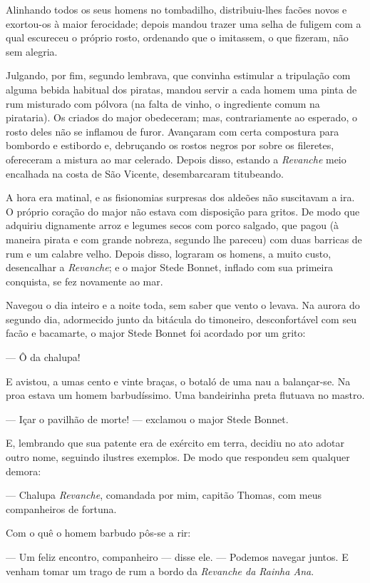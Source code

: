 Alinhando todos os seus homens no tombadilho, distribuiu-lhes facões novos
e exortou-os à maior ferocidade; depois mandou trazer uma selha de fuligem
com a qual escureceu o próprio rosto, ordenando que o imitassem, o que
fizeram, não sem alegria.

Julgando, por fim, segundo lembrava, que convinha estimular a tripulação
com alguma bebida habitual dos piratas, mandou servir a cada homem uma
pinta de rum misturado com pólvora (na falta de vinho, o ingrediente comum
na pirataria). Os criados do major obedeceram; mas, contrariamente ao
esperado, o rosto deles não se inflamou de furor. Avançaram com certa
compostura para bombordo e estibordo e, debruçando os rostos negros por
sobre os fileretes, ofereceram a mistura ao mar celerado. Depois disso,
estando a \textit{Revanche} meio encalhada na costa de São Vicente,
desembarcaram titubeando.

A hora era matinal, e as fisionomias surpresas dos aldeões não suscitavam a
ira. O próprio coração do major não estava com disposição para gritos. De
modo que adquiriu dignamente arroz e legumes secos com porco salgado, que
pagou (à maneira pirata e com grande nobreza, segundo lhe pareceu) com
duas barricas de rum e um calabre velho. Depois disso, lograram os homens,
a muito custo, desencalhar a \textit{Revanche}; e o major Stede Bonnet,
inflado com sua primeira conquista, se fez novamente ao mar.

Navegou o dia inteiro e a noite toda, sem saber que vento o levava. Na
aurora do segundo dia, adormecido junto da bitácula do timoneiro,
desconfortável com seu facão e bacamarte, o major Stede Bonnet foi
acordado por um grito:

--- Ô da chalupa!

E avistou, a umas cento e vinte braças, o botaló de uma nau a
balançar-se. Na proa estava um homem barbudíssimo. Uma bandeirinha preta
flutuava no mastro.

--- Içar o pavilhão de morte! --- exclamou o major Stede Bonnet.

E, lembrando que sua patente era de exército em terra, decidiu no ato
adotar outro nome, seguindo ilustres exemplos. De modo que respondeu sem
qualquer demora:

--- Chalupa \textit{Revanche}, comandada por mim, capitão Thomas, com meus
companheiros de fortuna.

Com o quê o homem barbudo pôs-se a rir:

--- Um feliz encontro, companheiro --- disse ele. --- Podemos navegar juntos. E
venham tomar um trago de rum a bordo da \textit{Revanche da Rainha Ana}.

